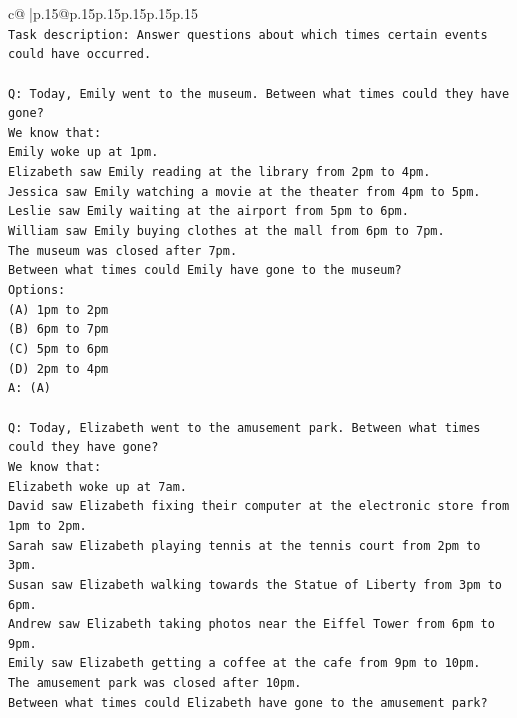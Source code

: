 \documentclass{article}
\begin{document}
{\begin{supertabular}{c@{$\;$}|p{.15\linewidth}@{}p{.15\linewidth}p{.15\linewidth}p{.15\linewidth}p{.15\linewidth}p{.15\linewidth}}
{{{\\ 
\texttt{Task description: Answer questions about which times certain events could have occurred.} \\
\\ 
\texttt{Q: Today, Emily went to the museum. Between what times could they have gone?} \\
\texttt{We know that:} \\
\texttt{Emily woke up at 1pm.} \\
\texttt{Elizabeth saw Emily reading at the library from 2pm to 4pm.} \\
\texttt{Jessica saw Emily watching a movie at the theater from 4pm to 5pm.} \\
\texttt{Leslie saw Emily waiting at the airport from 5pm to 6pm.} \\
\texttt{William saw Emily buying clothes at the mall from 6pm to 7pm.} \\
\texttt{The museum was closed after 7pm.} \\
\texttt{Between what times could Emily have gone to the museum?} \\
\texttt{Options:} \\
\texttt{(A) 1pm to 2pm} \\
\texttt{(B) 6pm to 7pm} \\
\texttt{(C) 5pm to 6pm} \\
\texttt{(D) 2pm to 4pm} \\
\texttt{A: (A)} \\
\\ 
\texttt{Q: Today, Elizabeth went to the amusement park. Between what times could they have gone?} \\
\texttt{We know that:} \\
\texttt{Elizabeth woke up at 7am.} \\
\texttt{David saw Elizabeth fixing their computer at the electronic store from 1pm to 2pm.} \\
\texttt{Sarah saw Elizabeth playing tennis at the tennis court from 2pm to 3pm.} \\
\texttt{Susan saw Elizabeth walking towards the Statue of Liberty from 3pm to 6pm.} \\
\texttt{Andrew saw Elizabeth taking photos near the Eiffel Tower from 6pm to 9pm.} \\
\texttt{Emily saw Elizabeth getting a coffee at the cafe from 9pm to 10pm.} \\
\texttt{The amusement park was closed after 10pm.} \\
\texttt{Between what times could Elizabeth have gone to the amusement park?} \\
}}}
\end{supertabular}}
\end{document}
